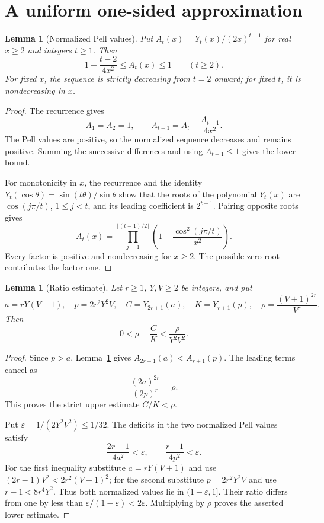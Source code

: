 \documentclass[11pt]{article}
\newtheorem{lemma}[theorem]{Lemma}
\begin{document}
\section{A uniform one-sided approximation}

\begin{lemma}[Normalized Pell values]\label{normal}
Put \(A_t(x)=Y_t(x)/(2x)^{t-1}\) for real \(x\ge2\) and
integers \(t\ge1\).  Then
\[
              1-\frac{t-2}{4x^2}\le A_t(x)\le1
                         \qquad(t\ge2).
\]
For fixed \(x\), the sequence is strictly decreasing from
\(t=2\) onward; for fixed \(t\), it is nondecreasing in \(x\).
\end{lemma}
\begin{proof}
The recurrence gives
\[
        A_1=A_2=1,\qquad
        A_{t+1}=A_t-\frac{A_{t-1}}{4x^2}.
\]
The Pell values are positive, so the normalized sequence decreases
and remains positive.  Summing the successive differences and using
\(A_{t-1}\le1\) gives the lower bound.

For monotonicity in \(x\), the recurrence and the identity
\(Y_t(\cos\theta)=\sin(t\theta)/\sin\theta\) show that
the roots of the polynomial \(Y_t(x)\) are
\(\cos(j\pi/t)\), \(1\le j<t\), and its leading
coefficient is \(2^{t-1}\).  Pairing opposite roots gives
\[
 A_t(x)=\prod_{j=1}^{\lfloor(t-1)/2\rfloor}
       \left(1-\frac{\cos^2(j\pi/t)}{x^2}\right).
\]
Every factor is positive and nondecreasing for \(x\ge2\).
The possible zero root contributes the factor one.
\end{proof}

\begin{lemma}[Ratio estimate]\label{ratio}
Let \(r\ge1\), \(Y,V\ge2\) be integers, and put
\[
 a=rY(V+1),\quad p=2r^2Y^2V,\quad
 C=Y_{2r+1}(a),\quad K=Y_{r+1}(p),\quad
 \rho=\frac{(V+1)^{2r}}{V^r}.
\]
Then
\[
        0<\rho-\frac CK<\frac{\rho}{Y^2V^2}.
\]
\end{lemma}
\begin{proof}
Since \(p>a\), Lemma~\ref{normal} gives
\(A_{2r+1}(a)<A_{r+1}(p)\).  The leading terms cancel as
\[
          \frac{(2a)^{2r}}{(2p)^r}=\rho.
\]
This proves the strict upper estimate \(C/K<\rho\).

Put \(\varepsilon=1/(2Y^2V^2)\le1/32\).
The deficits in the two normalized Pell values satisfy
\[
 \frac{2r-1}{4a^2}<\varepsilon,
 \qquad
 \frac{r-1}{4p^2}<\varepsilon.
\]
For the first inequality substitute \(a=rY(V+1)\) and use
\((2r-1)V^2<2r^2(V+1)^2\); for the second substitute
\(p=2r^2Y^2V\) and use \(r-1<8r^4Y^2\).
Thus both normalized values lie in \((1-\varepsilon,1]\).
Their ratio differs from one by less than
\(\varepsilon/(1-\varepsilon)<2\varepsilon\).
Multiplying by \(\rho\) proves the asserted lower estimate.
\end{proof}
\end{document}
